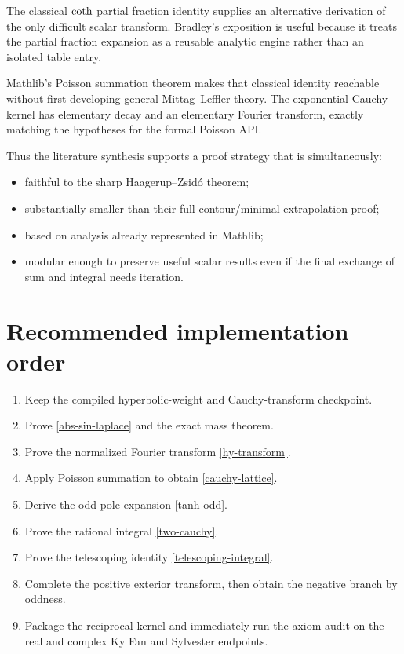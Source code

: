 The classical $\operatorname{coth}$ partial fraction identity supplies an alternative derivation of the only difficult scalar transform. Bradley's exposition is useful because it treats the partial fraction expansion as a reusable analytic engine rather than an isolated table entry.

Mathlib's Poisson summation theorem makes that classical identity reachable without first developing general Mittag--Leffler theory. The exponential Cauchy kernel has elementary decay and an elementary Fourier transform, exactly matching the hypotheses for the formal Poisson API.

Thus the literature synthesis supports a proof strategy that is simultaneously:
\begin{itemize}
\item faithful to the sharp Haagerup--Zsid\'o theorem;
\item substantially smaller than their full contour/minimal-extrapolation proof;
\item based on analysis already represented in Mathlib;
\item modular enough to preserve useful scalar results even if the final exchange of sum and integral needs iteration.
\end{itemize}

\section*{Recommended implementation order}

\begin{enumerate}[leftmargin=2em]
\item Keep the compiled hyperbolic-weight and Cauchy-transform checkpoint.
\item Prove \eqref{abs-sin-laplace} and the exact mass theorem.
\item Prove the normalized Fourier transform \eqref{hy-transform}.
\item Apply Poisson summation to obtain \eqref{cauchy-lattice}.
\item Derive the odd-pole expansion \eqref{tanh-odd}.
\item Prove the rational integral \eqref{two-cauchy}.
\item Prove the telescoping identity \eqref{telescoping-integral}.
\item Complete the positive exterior transform, then obtain the negative branch by oddness.
\item Package the reciprocal kernel and immediately run the axiom audit on the real and complex Ky Fan and Sylvester endpoints.
\end{enumerate}

